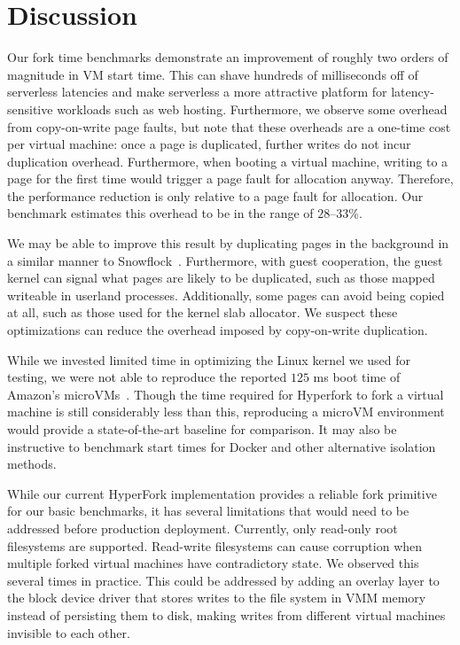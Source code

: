 \section{Discussion} \label{sec:discussion}

Our fork time benchmarks demonstrate an improvement of roughly two orders of
magnitude in VM start time. This can shave hundreds of milliseconds off of
serverless latencies and make serverless a more attractive platform for
latency-sensitive workloads such as web hosting. Furthermore, we observe some
overhead from copy-on-write page faults, but note that these overheads are a
one-time cost per virtual machine: once a page is duplicated, further writes do
not incur duplication overhead. Furthermore, when booting a virtual machine,
writing to a page for the first time would trigger a page fault for allocation
anyway. Therefore, the performance reduction is only relative to a page fault
for allocation. Our benchmark estimates this overhead to be in the range of
$28$--$33$\%.

We may be able to improve this result by duplicating pages in the background in
a similar manner to Snowflock~\cite{snowflock}. Furthermore, with guest
cooperation, the guest kernel can signal what pages are likely to be
duplicated, such as those mapped writeable in userland processes. Additionally,
some pages can avoid being copied at all, such as those used for the kernel
slab allocator. We suspect these optimizations can reduce the overhead imposed
by copy-on-write duplication.

While we invested limited time in optimizing the Linux kernel we used for
testing, we were not able to reproduce the reported $125$ ms boot time of
Amazon's microVMs~\cite{firecracker-spec}. Though the time required for
Hyperfork to fork a virtual machine is still considerably less than this,
reproducing a microVM environment would provide a state-of-the-art baseline for
comparison. It may also be instructive to benchmark start times for Docker and
other alternative isolation methods.

 While our current HyperFork implementation
provides a reliable fork primitive for our basic benchmarks, it has several
limitations that would need to be addressed before production deployment.
Currently, only read-only root filesystems are supported. Read-write
filesystems can cause corruption when multiple forked virtual machines have
contradictory state. We observed this several times in practice. This could be
addressed by adding an overlay layer to the block device driver that stores
writes to the file system in VMM memory instead of persisting them to disk,
making writes from different virtual machines invisible to each other.

